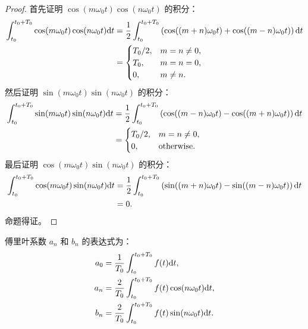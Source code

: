\begin{proof}
    首先证明 $\cos(m\omega_0 t)\cos(n\omega_0 t)$ 的积分：
    \begin{align*}
        \int_{t_0}^{t_0 + T_0}\cos(m\omega_0 t)\cos(n\omega_0 t)\mathrm{d}{t}
        & = \frac{1}{2}\int_{t_0}^{t_0 + T_0}\left(\cos((m + n)\omega_0 t) + \cos((m - n)\omega_0 t)\right)\mathrm{d}{t} \\
        & = \begin{cases}
            T_0 / 2, & m = n \neq 0, \\
            T_0, & m = n = 0, \\
            0, & m \neq n.
        \end{cases}
    \end{align*}
    然后证明 $\sin(m\omega_0 t)\sin(n\omega_0 t)$ 的积分：
    \begin{align*}
        \int_{t_0}^{t_0 + T_0}\sin(m\omega_0 t)\sin(n\omega_0 t)\mathrm{d}{t}
        & = \frac{1}{2}\int_{t_0}^{t_0 + T_0}\left(\cos((m - n)\omega_0 t) - \cos((m + n)\omega_0 t)\right)\mathrm{d}{t} \\
        & = \begin{cases}
            T_0 / 2, & m = n \neq 0, \\
            0, & \text{otherwise}.
        \end{cases}
    \end{align*}
    最后证明 $\cos(m\omega_0 t)\sin(n\omega_0 t)$ 的积分：
    \begin{align*}
        \int_{t_0}^{t_0 + T_0}\cos(m\omega_0 t)\sin(n\omega_0 t)\mathrm{d}{t}
        & = \frac{1}{2}\int_{t_0}^{t_0 + T_0}\left(\sin((m + n)\omega_0 t) - \sin((m - n)\omega_0 t)\right)\mathrm{d}{t} \\
        & = 0.
    \end{align*}
    命题得证。
\end{proof}

\begin{corollary}
    傅里叶系数 $a_n$ 和 $b_n$ 的表达式为：
    \begin{align*}
        a_0 & = \frac{1}{T_0}\int_{t_0}^{t_0 + T_0}f(t)\mathrm{d}{t}, \\
        a_n & = \frac{2}{T_0}\int_{t_0}^{t_0 + T_0}f(t)\cos(n\omega_0 t)\mathrm{d}{t}, \\
        b_n & = \frac{2}{T_0}\int_{t_0}^{t_0 + T_0}f(t)\sin(n\omega_0 t)\mathrm{d}{t}.
    \end{align*}
\end{corollary}

